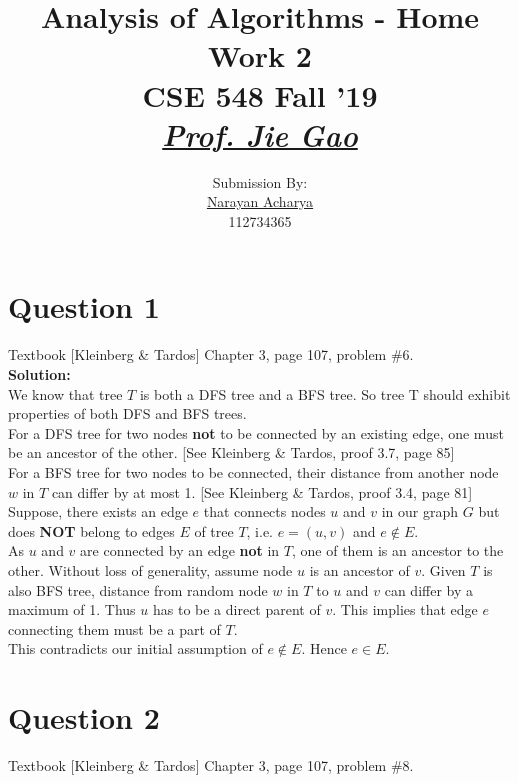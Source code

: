 \documentclass[11pt]{article}
\title{
	Analysis of Algorithms - Home Work 2\\[2mm]
	\large CSE 548 Fall '19\\[1mm]
	\href{mailto:jgao@cs.stonybrook.edu}{\textit{Prof. Jie Gao}}
}
\author{
	\small Submission By: \\
	\href{mailto:nacharya@cs.stonybrook.edu}{Narayan Acharya} \\
	\small 112734365
}
\date{\vspace{-5ex}}
\begin{document}
\maketitle
\thispagestyle{fancy} %

\tableofcontents

\clearpage

\section{Question 1} Textbook [Kleinberg \& Tardos] Chapter 3, page 107, problem \#6. \\
\textbf{Solution:} \\

We know that tree $ T $ is both a DFS tree and a BFS tree. So tree T should exhibit properties of both DFS and BFS trees. \\

For a DFS tree for two nodes \textbf{not} to be connected by an existing edge, one must be an ancestor of the other. [See Kleinberg \& Tardos, proof 3.7, page 85] \\

For a BFS tree for two nodes to be connected, their distance from another node $ w $ in $ T $ can differ by at most 1. [See Kleinberg \& Tardos, proof 3.4, page 81] \\

Suppose, there exists an edge $ e $ that connects nodes $ u $ and $ v $ in our graph $ G $ but does \textbf{NOT} belong to edges $ E $ of tree $ T $, i.e. $ e=(u,v) $ and $ e \notin E $. \\

As $ u $ and $ v $ are connected by an edge \textbf{not} in $ T $, one of them is an ancestor to the other. Without loss of generality, assume node $ u $ is an ancestor of $ v $. Given $ T $ is also BFS tree, distance from random node $ w $ in $ T $ to $ u $ and $ v $ can differ by a maximum of 1. Thus $ u $ has to be a direct parent of $ v $. This implies that edge $ e $ connecting them must be a part of $ T $. \\

This contradicts our initial assumption of $ e \notin E $. Hence $ e \in E $.
   
\clearpage
\section{Question 2} Textbook [Kleinberg \& Tardos] Chapter 3, page 107, problem \#8. \\
\end{document}
